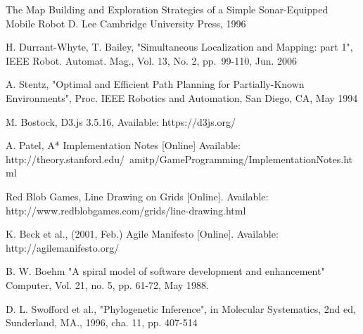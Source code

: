 \documentclass[authoryearcitations]{UoYCSproject}
\begin{document}
\begin{thebibliography}{56}
	The Map Building and Exploration Strategies of a Simple Sonar-Equipped Mobile Robot
	D. Lee
	Cambridge University Press, 1996
	
	H. Durrant-Whyte, T. Bailey,
	"Simultaneous Localization and Mapping: part 1",
	IEEE Robot. Automat. Mag.,
	Vol. 13, No. 2, pp.~99-110,
	Jun. 2006
	
	A. Stentz,
	"Optimal and Efficient Path Planning for Partially-Known Environments",
	Proc. IEEE Robotics and Automation,
	San Diego, CA,
	May 1994
	
	M. Bostock,
	D3.js 3.5.16,
	Available: https://d3js.org/

	A. Patel,
	A* Implementation Notes [Online]
	Available: http://theory.stanford.edu/~amitp/GameProgramming/ImplementationNotes.html

	Red Blob Games,
	Line Drawing on Grids [Online].
	Available: http://www.redblobgames.com/grids/line-drawing.html
	
	K. Beck et al.,
	(2001, Feb.)
	Agile Manifesto [Online].
	Available: http://agilemanifesto.org/
	
	B. W. Boehm
	"A spiral model of software development and enhancement"
	Computer, 
	Vol. 21, no. 5, pp. 61-72, 
	May 1988.
	
	D. L. Swofford et al.,
	"Phylogenetic Inference", in Molecular Systematics,
	2nd ed, Sunderland, MA., 1996, cha. 11, pp. 407-514

\end{thebibliography}
\end{document}
